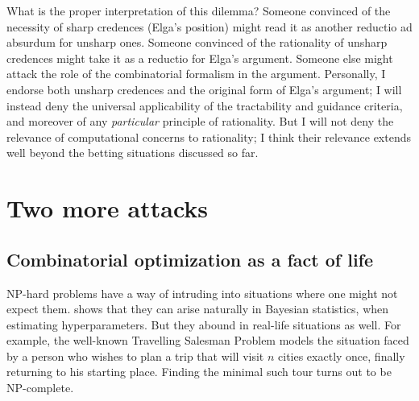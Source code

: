 \documentclass[letterpaper,12pt]{article}
\begin{document}
What is the proper interpretation of this dilemma? Someone convinced of the necessity of sharp credences (Elga's position) might read it as another reductio ad absurdum for unsharp ones. Someone convinced of the rationality of unsharp credences might take it as a reductio for Elga's argument. Someone else might attack the role of the combinatorial formalism in the argument. Personally, I endorse both unsharp credences and the original form of Elga's argument; I will instead deny the universal applicability of the tractability and guidance criteria, and moreover of any \emph{particular} principle of rationality. But I will not deny the relevance of computational concerns to rationality; I think their relevance extends well beyond the betting situations discussed so far.




\section{Two more attacks}
\subsection{Combinatorial optimization as a fact of life}
NP-hard problems have a way of intruding into situations where one might not expect them. \citet{robert2007choice} shows that they can arise naturally in Bayesian statistics, when estimating hyperparameters. But they abound in real-life situations as well. For example, the well-known Travelling Salesman Problem models the situation faced by a person who wishes to plan a trip that will visit $n$ cities exactly once, finally returning to his starting place. Finding the minimal such tour turns out to be NP-complete.
\end{document}
